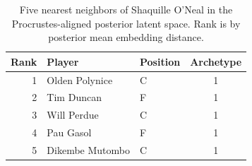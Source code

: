 \begin{table}[htbp]
  \centering\small
  \begin{tabular}{rllc}
    \toprule
    Rank & Player & Position & Archetype \\
    \midrule
    1 & Olden Polynice & C & 1 \\
    2 & Tim Duncan & F & 1 \\
    3 & Will Perdue & C & 1 \\
    4 & Pau Gasol & F & 1 \\
    5 & Dikembe Mutombo & C & 1 \\
    \bottomrule
  \end{tabular}
  \caption{Five nearest neighbors of Shaquille O'Neal in the Procrustes-aligned posterior latent space. Rank is by posterior mean embedding distance.}
  \label{tab:Shaquille_O_Neal_neighbors}
\end{table}

